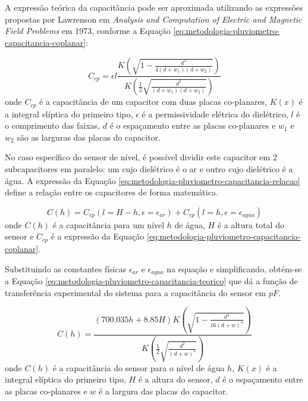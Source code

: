 \documentclass[a4paper]{instrumentacao}
\begin{document}
A expressão teórica da capacitância pode ser aproximada utilizando as expressões propostas por Lawrenson em \textit{Analysis and Computation of Electric and Magnetic Field Problems}\cite{capacitor-plano} em 1973, conforme a Equação \ref{eq:metodologia-pluviometro-capacitancia-coplanar}:

\begin{equation}
	C_{cp} = \epsilon l \frac{K\left(\sqrt{1-\frac{d^2}{4 (d+w_1) (d+w_2)}}\right)}{K\left(\frac{1}{2} \sqrt{\frac{d^2}{(d+w_1) (d+w_2)}}\right)}
	\label{eq:metodologia-pluviometro-capacitancia-coplanar}
\end{equation}
\noindent onde $C_{cp}$ é a capacitância de um capacitor com duas placas co-planares, $K(x)$ é a integral elíptica do primeiro tipo, $\epsilon$ é a permissividade elétrica do dielétrico, $l$ é o comprimento das faixas, $d$ é o espaçamento entre as placas co-planares e $w_1$ e $w_2$ são as larguras das placas do capacitor.

No caso específico do sensor de nível, é possível dividir este capacitor em 2 subcapacitores em paralelo: um cujo dielétrico é o ar e outro cujo dielétrico é a água. A expressão da Equação \ref{eq:metodologia-pluviometro-capacitancia-relacao} define a relação entre os capacitores de forma matemática.

\begin{equation}
	C(h) = C_{cp}\left(l=H-h, \epsilon=\epsilon_{ar}\right) + C_{cp}\left(l=h, \epsilon=\epsilon_{agua}\right)
	\label{eq:metodologia-pluviometro-capacitancia-relacao}
\end{equation}
\noindent onde $C(h)$ é a capacitância para um nível $h$ de água, $H$ é a altura total do sensor e $C_{cp}$ é a expressão da Equação \ref{eq:metodologia-pluviometro-capacitancia-coplanar}.

Substituindo as constantes físicas $\epsilon_{ar}$ e $\epsilon_{agua}$ na equação e simplificando, obtém-se a Equação \ref{eq:metodologia-pluviometro-capacitancia-teorico} que dá a função de transferência experimental do sistema para a capacitância do sensor em $pF$.

\begin{equation}
	C(h) = \frac{(700.035 h+8.85 H) K\left(\sqrt{1-\frac{d^4}{16 (d+w)^4}}\right)}{K\left(\frac{1}{2} \sqrt{\frac{d^2}{(d+w)^2}}\right)}
	\label{eq:metodologia-pluviometro-capacitancia-teorico}
\end{equation}
\noindent onde $C(h)$ é a capacitância do sensor para o nível de água $h$, $K(x)$ é a integral elíptica do primeiro tipo, $H$ é a altura do sensor, $d$ é o espaçamento entre as placas co-planares e $w$ é a largura das placas do capacitor.
\end{document}
